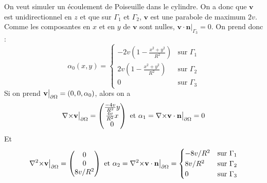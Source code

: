 On veut simuler un écoulement de Poiseuille dans le cylindre. On a donc que $\mathbf{v}$ est unidirectionnel en $z$ et que sur $\Gamma_1$ et $\Gamma_2$, $\mathbf{v}$ est une parabole de maximum $2v$. Comme les composantes en $x$ et en $y$ de $\mathbf{v}$ sont nulles, $\mathbf{v}\cdot\mathbf{n}\big\rvert_{\Gamma_3}=0$. On prend donc :
\begin{equation}\label{alpha0}
 \alpha_0(x,y)= \begin{cases} -2v\left(1-\frac{x^2+y^2}{R^2}\right) &\mbox{sur } \Gamma_1\\
2v\left(1-\frac{x^2+y^2}{R^2}\right)&\mbox{sur } \Gamma_2\\
0 &\mbox{sur } \Gamma_3 \end{cases} \end{equation}
Si on prend $\mathbf{v}{\big\rvert_{\partial\Omega}}=(0,0,\alpha_0)$, alors on a 
\[ {\nabla\times}\mathbf{v}{\big\rvert_{\partial\Omega}} = \begin{pmatrix}\frac{-4v}{R^2}y\\\frac{4v}{R^2}x\\0\end{pmatrix}\mbox{ et } \alpha_1={\nabla\times}\mathbf{v}\cdot\mathbf{n}{\big\rvert_{\partial\Omega}} = 0 \]
Et
\[ {\nabla^2\times}\mathbf{v}{\big\rvert_{\partial\Omega}} = \begin{pmatrix}0\\0\\8v/R^2\end{pmatrix}\mbox{ et } \alpha_2={\nabla^2\times}\mathbf{v}\cdot\mathbf{n}{\big\rvert_{\partial\Omega}} = \begin{cases} -8v/R^2 &\mbox{sur } \Gamma_1\\
8v/R^2 &\mbox{sur } \Gamma_2\\ 0 &\mbox{sur } \Gamma_3 \end{cases} \]

